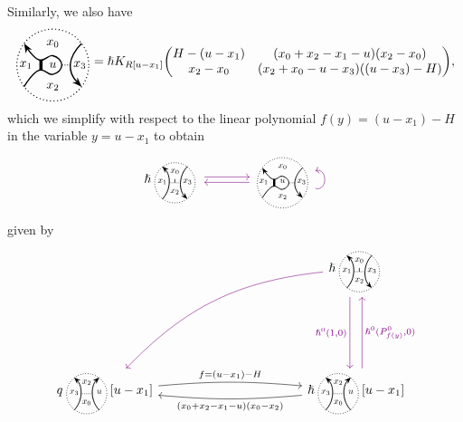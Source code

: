 \documentclass{article}
\newcommand{\vsdr}[5]{%
	\begin{tikzcd}[column sep=large, ampersand replacement=\&]
		{#1} 
		\arrow[r, "{#3}", shift left=0.5ex, color=violet] 
		\arrow[r, leftarrow, "{#4}", shift right=0.5ex, swap, color=violet] 
		\& #2 \arrow[loop right, distance=1em, in=15, out=-15, "{#5}",swap, color=violet]
	\end{tikzcd}%
}
\newcommand{\kmf}[2]{
	K_{#1}{\begin{pmatrix}
			#2
		\end{pmatrix}
	}	
}
\theoremstyle{plain} %
\theoremstyle{definition} %
\theoremstyle{remark} %
\begin{document}
Similarly, we also have 
\[
\ThickThinUnoriented{u}{x_0}{x_1}{x_2}{x_3}
=
\hslash \kmf{R[u-x_1]}{H-(u-x_1) & (x_0+x_2-x_1-u)(x_2-x_0) \\							
	x_2-x_0 & (x_2+x_0-u-x_3)((u-x_3)-H) }
,
\]
which we simplify with respect to the linear polynomial $f(y)=(u-x_1)-H$ in the variable $y=u-x_1$ to obtain 
\begin{equation}\label{eq:sdrthickthin}
		\vsdr{\hslash \scalebox{0.7}{\UnorientedHorizontalThinEdge{x_0}{x_1}{x_2}{x_3}{+}}}
{\scalebox{0.7}{\ThickThinUnoriented{u}{x_0}{x_1}{x_2}{x_3}}}
{}{}{}
\end{equation}
given by
\[
\begin{tikzcd}[column sep=4cm, row sep=2cm, ampersand replacement=\&]
	\&
	\hslash \scalebox{0.7}{\UnorientedHorizontalThinEdge{x_0}{x_1}{x_2}{x_3}{+}} 
	\arrow[d, shift right=2, "{\hslash^0(1,0)}", swap, color=violet] 
	\arrow[dl, bend right=20, color=violet] 
	\\   
	q  \scalebox{0.7}{\ThinEdge{x_2}{x_3}{x_0}{u}}[u-x_1] 
	\arrow[r, "f=(u-x_1)-H", bend left=5]
	\& 
	\hslash	\scalebox{0.7}{\ThinEdge{x_2}{x_3}{x_0}{u}}[u-x_1] 
	\arrow[l, "(x_0+x_2-x_1-u)(x_0-x_2)", bend left=5]
	\arrow[u, shift right=2, "{\hslash^0(P^0_{f(y)},0)}",swap, color=violet]	
\end{tikzcd}
\]
\end{document}
